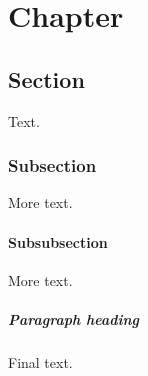 \documentclass[11pt,a4paper]{book}
\begin{document}
\chapter{Chapter}
\section{Section}
Text.
\subsection{Subsection}
More text.
\subsubsection{Subsubsection}
More text.
\paragraph{Paragraph heading} Final text.
\end{document}
